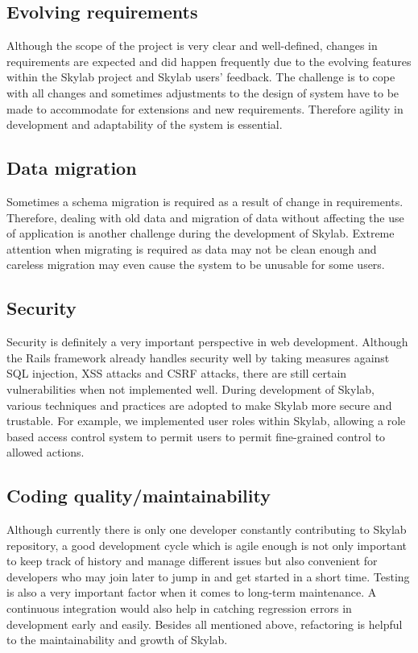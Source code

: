\subsection{Evolving requirements}

Although the scope of the project is very clear and well-defined, changes in requirements are expected and did happen frequently due to the evolving features within the Skylab project and Skylab users' feedback. The challenge is to cope with all changes and sometimes adjustments to the design of system have to be made to accommodate for extensions and new requirements. Therefore agility in development and adaptability of the system is essential.

\subsection{Data migration}

Sometimes a schema migration is required as a result of change in requirements. Therefore, dealing with old data and migration of data without affecting the use of application is another challenge during the development of Skylab. Extreme attention when migrating is required as data may not be clean enough and careless migration may even cause the system to be unusable for some users.

\subsection{Security}

Security is definitely a very important perspective in web development. Although the Rails framework already handles security well by taking measures against SQL injection, XSS attacks and CSRF attacks, there are still certain vulnerabilities when not implemented well. During development of Skylab, various techniques and practices are adopted to make Skylab more secure and trustable. For example, we implemented user roles within Skylab, allowing a role based access control system to permit users to permit fine-grained control to allowed actions.

\subsection{Coding quality/maintainability}

Although currently there is only one developer constantly contributing to Skylab repository, a good development cycle which is agile enough is not only important to keep track of history and manage different issues but also convenient for developers who may join later to jump in and get started in a short time. Testing is also a very important factor when it comes to long-term maintenance. A continuous integration would also help in catching regression errors in development early and easily. Besides all mentioned above, refactoring is helpful to the maintainability and growth of Skylab.

